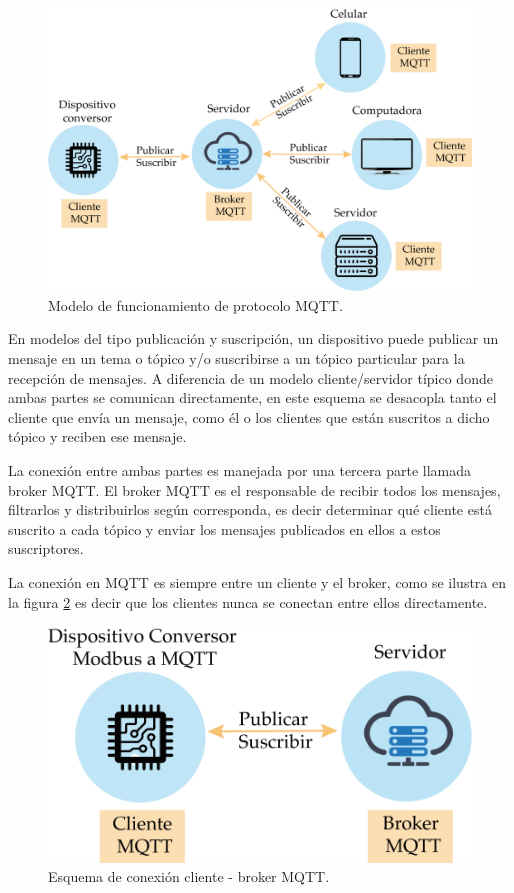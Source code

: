 \begin{figure}[htpb]
	\centering
	\includegraphics[scale=.7]{./Figures/mqtt-protocol.png}
	\caption[Esquema de funcionamiento MQTT ]{Modelo de funcionamiento de protocolo MQTT.}
	\label{fig:mqtt-esquema}
\end{figure}

En modelos del tipo publicación y suscripción, un dispositivo puede publicar un mensaje en un tema o tópico y/o suscribirse a un tópico particular para la recepción de mensajes.  A diferencia de un modelo cliente/servidor típico donde ambas partes se comunican directamente, en este esquema se desacopla tanto el cliente que envía un mensaje, como él o los clientes que están suscritos a dicho tópico y reciben ese mensaje. 

La conexión entre ambas partes es manejada por una tercera parte llamada broker MQTT.  El broker MQTT es el responsable de recibir todos los mensajes, filtrarlos y distribuirlos según corresponda, es decir determinar qué cliente está suscrito a cada tópico y enviar los mensajes publicados en ellos a estos suscriptores.

La conexión en MQTT es siempre entre un cliente y el broker, como se ilustra en la figura \ref{fig:mqtt-cliente-broker} es decir que los clientes nunca se conectan entre ellos directamente.

\begin{figure}[htpb]
	\centering
	\includegraphics[scale=.7]{./Figures/cliente-broker.png}
	\caption{Esquema de conexión cliente - broker MQTT.}
	\label{fig:mqtt-cliente-broker}
\end{figure}

